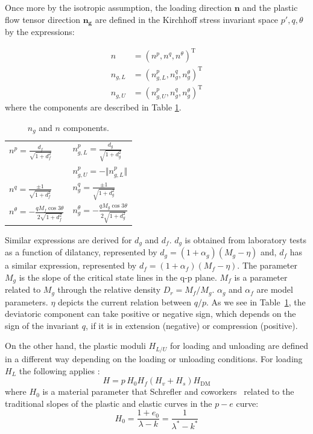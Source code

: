 \documentclass[preprint,12pt,a4paper]{elsarticle}
\begin{document}
Once more by the isotropic assumption, the loading direction $ \boldsymbol{n}$ and the plastic flow tensor direction $ \boldsymbol{n_g}$ are defined in the Kirchhoff stress invariant space $p', q, \theta $ by the expressions:

\begin{eqnarray}
n &=\left(n^{p}, n^{q}, n^{\theta}\right)^{\mathrm{T}} \\ n_{g,L} &=\left(n_{g,L}^{p}, n_{g}^{q}, n_{g}^{\theta}\right)^{\mathrm{T}}
\\ n_{g,U} &=\left(n_{g,U}^{p}, n_{g}^{q}, n_{g}^{\theta}\right)^{\mathrm{T}}
\end{eqnarray}
where the components are described in Table \ref{tab2}.

\begin{table}[H]
\caption{\label{tab2} $n_{g}$ and $n$ components.} 
\centering
	\begin{tabular}{l|l}
        $n^{p} =\frac{d_{f}}{\sqrt{1+d_{f}^{2}}}$ &
        $n_{g,L}^{p} =\frac{d_{g}}{\sqrt{1+d_{g}^{2}}}$
        \\ 
         &
        $n_{g,U}^{p} = -\Vert n_{g,L}^{p} \Vert$ \\
        $n^{q} =\frac{\pm 1}{\sqrt{1+d_{f}^{2}}}$ &
        $n_{g}^{q} = \frac{\pm 1}{\sqrt{1+d_{g}^{2}}}$ \\  
        $n^{\theta} =-\frac{q M_{f} \cos 3 \theta}{2 \sqrt{1+d_{f}^{2}}}$ &
         $n_{g}^{\theta} =-\frac{q M_{g} \cos 3 \theta}{2 \sqrt{1+d_{g}^{2}}}$
	\end{tabular}
\end{table}

Similar expressions are derived for $d_{g}$ and $d_{f}$. $d_{g}$ is obtained from laboratory tests as a function of dilatancy, represented by  $d_{g}=\left(1+\alpha_{g}\right)\left(M_{g}-\eta\right)$ and, $d_{f}$ has a similar expression, represented by   $d_{f}=\left(1+\alpha_{f}\right)\left(M_{f}-\eta\right)$. The parameter $M_{g}$ is the slope of the critical state lines in the q-p plane. $M_{f}$ is a parameter related to $M_{g}$ through the relative density $D_r = M_{f} / M_{g}$. $\alpha_{g}$ and $\alpha_{f}$ are model parameters. $\eta$ depicts the current relation between $q/p$. As we see in Table~\ref{tab2}, the deviatoric component can take positive or negative sign, which depends on the sign of the invariant $q$, if it is in extension (negative) or compression (positive).

 On the other hand, the plastic moduli $H_{L / U}$ for loading and unloading are defined in a different way depending on the loading or unloading conditions. For loading $H_L$ the following applies :
\begin{equation}
H=p\,H_{0}  H_{f}\left(H_{v}+H_{s}\right) H_{\mathrm{DM}}
\end{equation}\label{Eq_H}
where $H_0$ is a material parameter that Schrefler and coworkers~\cite{Santagiuliana2006} related to the traditional slopes of the plastic and elastic curves in the $p-e$ curve:
\begin{equation}
H_{0}=\frac{1+e_{0}}{\lambda-k}=\frac{1}{\lambda^*-k^*}
\end{equation}
\end{document}
